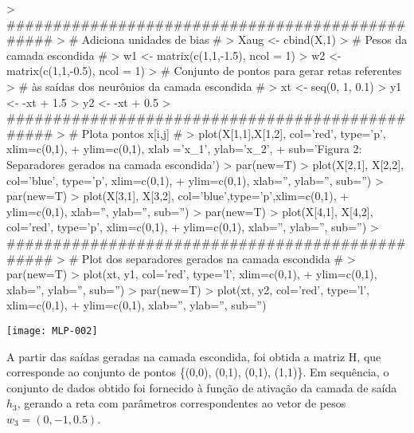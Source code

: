 \documentclass{article}
\begin{document}
\begin{Schunk}
\begin{Sinput}
> ################################################
> # Adiciona unidades de bias #
> Xaug <- cbind(X,1)
> # Pesos da camada escondida #
> w1 <- matrix(c(1,1,-1.5), ncol = 1)
> w2 <- matrix(c(1,1,-0.5), ncol = 1)
> # Conjunto de pontos para gerar retas referentes 
> # às saídas dos neurônios da camada escondida #
> xt <- seq(0, 1, 0.1)
> y1 <- -xt + 1.5
> y2 <- -xt + 0.5
> ################################################
> # Plota pontos x[i,j] #
> plot(X[1,1],X[1,2], col='red', type='p', xlim=c(0,1),
+      ylim=c(0,1), xlab ='x_1', ylab='x_2',
+      sub='Figura 2: Separadores gerados na camada escondida')
> par(new=T)
> plot(X[2,1], X[2,2], col='blue', type='p', xlim=c(0,1),
+      ylim=c(0,1), xlab='', ylab='', sub='')
> par(new=T)
> plot(X[3,1], X[3,2], col='blue',type='p',xlim=c(0,1),
+      ylim=c(0,1), xlab='', ylab='', sub='')
> par(new=T)
> plot(X[4,1], X[4,2], col='red', type='p', xlim=c(0,1),
+      ylim=c(0,1), xlab='', ylab='', sub='')
> ################################################
> # Plot dos separadores gerados na camada escondida  #
> par(new=T)
> plot(xt, y1, col='red', type='l', xlim=c(0,1), 
+      ylim=c(0,1), xlab='', ylab='', sub='')
> par(new=T)
> plot(xt, y2, col='red', type='l', xlim=c(0,1),
+      ylim=c(0,1), xlab='', ylab='', sub='')
\end{Sinput}
\end{Schunk}
\texttt{[image: MLP-002]}

A partir das saídas geradas na camada escondida, foi obtida a matriz H, que corresponde ao conjunto de pontos \{(0,0), (0,1), (0,1), (1,1)\}. Em sequência, o conjunto de dados obtido foi fornecido à função de ativação da camada de saída $h_{3}$, gerando a reta com parâmetros correspondentes ao vetor de pesos $w_{3} = (0, -1, 0.5)$.
\end{document}

